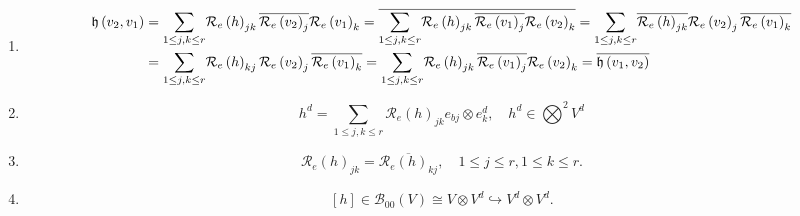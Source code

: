 \documentclass[aps,preprint]{revtex4}%
\begin{document}
\begin{enumerate}
\begin{enumerate}
\item
\begin{align}
\mathfrak{h}\left(  v_{2},v_{1}\right)   &  =%
{\displaystyle\sum\limits_{1\leq j,k\leq r}}
\mathcal{R}_{e}\left(  h\right)  _{jk}\overline{\mathcal{R}_{e}\left(
v_{2}\right)  _{j}}\mathcal{R}_{e}\left(  v_{1}\right)  _{k}=\overline{%
{\displaystyle\sum\limits_{1\leq j,k\leq r}}
\mathcal{R}_{e}\left(  h\right)  _{jk}\overline{\mathcal{R}_{e}\left(
v_{1}\right)  _{j}}\mathcal{R}_{e}\left(  v_{2}\right)  _{k}}=%
{\displaystyle\sum\limits_{1\leq j,k\leq r}}
\overline{\mathcal{R}_{e}\left(  h\right)  _{jk}}\mathcal{R}_{e}\left(
v_{2}\right)  _{j}\overline{\mathcal{R}_{e}\left(  v_{1}\right)  _{k}}\\
&  =%
{\displaystyle\sum\limits_{1\leq j,k\leq r}}
\mathcal{R}_{e}\left(  h\right)  _{kj}\mathcal{R}_{e}\left(  v_{2}\right)
_{j}\overline{\mathcal{R}_{e}\left(  v_{1}\right)  _{k}}=%
{\displaystyle\sum\limits_{1\leq j,k\leq r}}
\mathcal{R}_{e}\left(  h\right)  _{jk}\overline{\mathcal{R}_{e}\left(
v_{1}\right)  _{j}}\mathcal{R}_{e}\left(  v_{2}\right)  _{k}=\overline
{\mathfrak{h}\left(  v_{1},v_{2}\right)  }%
\end{align}


\item
\begin{equation}
h^{d}=%
{\displaystyle\sum\limits_{1\leq j,k\leq r}}
\mathcal{R}_{e}\left(  h\right)  _{jk}e_{bj}\otimes e_{k}^{d},\quad h^{d}\in%
{\displaystyle\bigotimes\nolimits^{2}}
V^{d}%
\end{equation}


\item
\begin{equation}
\mathcal{R}_{e}\left(  h\right)  _{jk}=\overline{\mathcal{R}_{e}\left(
h\right)  _{kj}},\quad1\leq j\leq r,1\leq k\leq r.
\end{equation}


\item
\begin{equation}
\left[  h\right]  \in\mathcal{B}_{00}\left(  V\right)  \cong V\otimes
V^{d}\hookrightarrow V^{d}\otimes V^{d}.
\end{equation}



\end{enumerate}
\end{enumerate}
\end{document}
